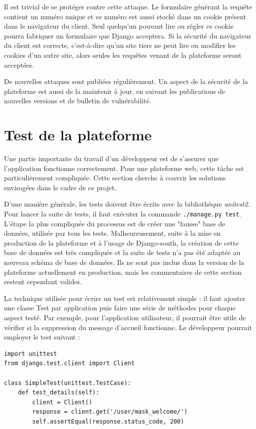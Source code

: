 \documentclass[a4paper,12pt]{article}
\begin{document}
Il est trivial de se protéger contre cette attaque. Le formulaire générant la
requête contient un numéro unique et ce numéro est aussi stocké dans un cookie présent
dans le navigateur du client. Seul quelqu'un pouvant lire ou régler ce cookie pourra
fabriquer un formulaire que Django acceptera. Si la sécurité du navigateur du client
est correcte, c'est-à-dire qu'un site tiers ne peut lire ou modifier les cookies d'un
autre site, alors seules les requêtes venant de la plateforme seront acceptées.

De nouvelles attaques sont publiées régulièrement. Un aspect de la sécurité de la plateforme
est aussi de la maintenir à jour, en suivant les publications de nouvelles versions
et de bulletin de vulnérabilité.


\section{Test de la plateforme}

Une partie importante du travail d'un développeur est de s'assurer que l'application
fonctionne correctement. Pour une plateforme web, cette tâche est particulièrement
compliquée. Cette section cherche à couvrir les solutions envisagées dans le cadre
de ce projet.

D'une manière générale, les tests doivent être écrits avec la bibliothèque
\textit{unitest2}. Pour lancer la suite de tests, il faut exécuter la commande
\texttt{./manage.py test}. L'étape la plus compliquée du processus est de créer
une "fausse" base de données, utilisée par tous les tests. Malheureusement, suite
à la mise en production de la plateforme et à l'usage de Django-south, la création de cette
base de données est très compliquée et la suite de tests n'a pas été adaptée au nouveau
schéma de base de données. Ils ne sont pas inclus dans la version de la plateforme
actuellement en production, mais les commentaires de cette section restent cependant
valides.

La technique utilisée pour écrire un test est relativement simple : il faut ajouter une classe
Test par application puis faire une série de méthodes pour chaque aspect testé.
Par exemple, pour l'application utilisateur, il pourrait être utile de vérifier
si la suppression du message d'accueil fonctionne.
Le développeur pourrait employer le test suivant :

\begin{verbatim}
import unittest
from django.test.client import Client

class SimpleTest(unittest.TestCase):
    def test_details(self):
        client = Client()
        response = client.get('/user/mask_welcome/')
        self.assertEqual(response.status_code, 200)
\end{verbatim}
\end{document}
